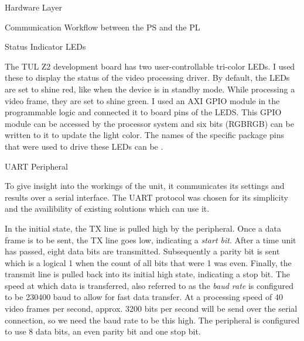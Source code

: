 \documentclass{matthijs}
\begin{document}
\begin{hoofdstuk}{Hardware Layer}
\begin{paragraaf}{Communication Workflow between the PS and the PL}
		\end{paragraaf}

		\begin{paragraaf}{Status Indicator LEDs}

			The TUL Z2 development board has two user-controllable tri-color LEDs.
			I used these to display the status of the video processing driver.
			By default, the LEDs are set to shine red, like when the device is in standby mode.
			While processing a video frame, they are set to shine green.
			I used an AXI GPIO module in the programmable logic and connected it to board pins of the LEDS.
			This GPIO module can be accessed by the processor system and six bits (RGBRGB) can be written to it to update the light color.
			The names of the specific package pins that were used to drive these LEDs can be .

		\end{paragraaf}

		\begin{paragraaf}{UART Peripheral}

			To give insight into the workings of the unit, it communicates its settings and results over a serial interface.
			The UART protocol was chosen for its simplicity and the availibility of existing solutions which can use it.

			\bigskip

			In the initial state, the TX line is pulled high by the peripheral.
			Once a data frame is to be sent, the TX line goes low, indicating a \textit{start bit}.
			After a time unit has passed, eight data bits are transmitted.
			Subsequently a parity bit is sent which is a logical 1 when the count of all bits that were 1 was even.
			Finally, the transmit line is pulled back into its initial high state, indicating a stop bit.
			The speed at which data is transferred, also referred to as the \textit{baud rate} is configured to be 230400 baud to allow for fast data transfer.
			At a processing speed of 40 video frames per second, approx. 3200 bits per second will be send over the serial connection, so we need the baud rate to be this high.
			The peripheral is configured to use 8 data bits, an even parity bit and one stop bit.

		\end{paragraaf}
	\end{hoofdstuk}
\end{document}
